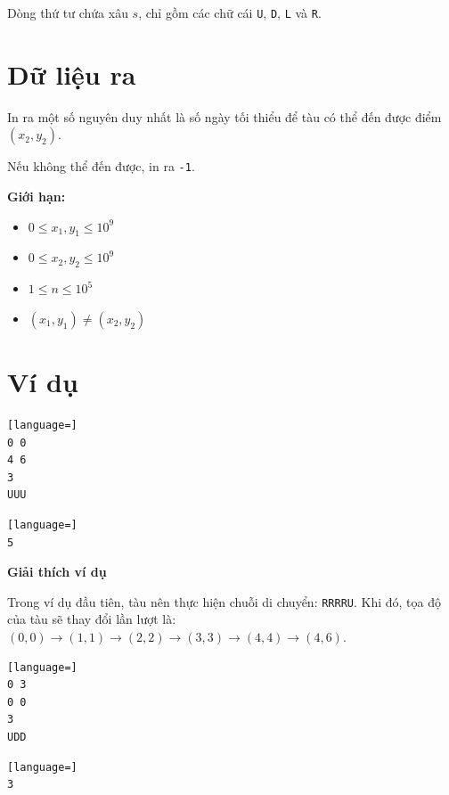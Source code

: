 \documentclass[12pt,a4paper]{article}
\newcommand{\explanation}{%
  \vspace{6pt}\textbf{\textcolor{sectioncolor}{Giải thích ví dụ}}\par\vspace{2pt}%
}
\begin{document}
Dòng thứ tư chứa xâu $s$, chỉ gồm các chữ cái \texttt{U}, \texttt{D}, \texttt{L} và \texttt{R}.

\section*{Dữ liệu ra}
In ra một số nguyên duy nhất là số ngày tối thiểu để tàu có thể đến được điểm $(x_2, y_2)$.

Nếu không thể đến được, in ra \texttt{-1}.

\begin{constraintbox}
\textbf{Giới hạn:}
\begin{itemize}[itemsep=0pt,topsep=2pt]
  \item $0 \le x_1, y_1 \le 10^9$
  \item $0 \le x_2, y_2 \le 10^9$
  \item $1 \le n \le 10^5$
  \item $(x_1, y_1) \neq (x_2, y_2)$
\end{itemize}
\end{constraintbox}

\section*{Ví dụ}

\begin{inputbox}
\begin{lstlisting}[language=]
0 0
4 6
3
UUU
\end{lstlisting}
\end{inputbox}
\begin{outputbox}
\begin{lstlisting}[language=]
5
\end{lstlisting}
\end{outputbox}

\explanation
Trong ví dụ đầu tiên, tàu nên thực hiện chuỗi di chuyển: \texttt{RRRRU}. Khi đó, tọa độ của tàu sẽ thay đổi lần lượt là: $(0, 0) \to (1, 1) \to (2, 2) \to (3, 3) \to (4, 4) \to (4, 6)$.

\begin{inputbox}
\begin{lstlisting}[language=]
0 3
0 0
3
UDD
\end{lstlisting}
\end{inputbox}
\begin{outputbox}
\begin{lstlisting}[language=]
3
\end{lstlisting}
\end{outputbox}
\end{document}
